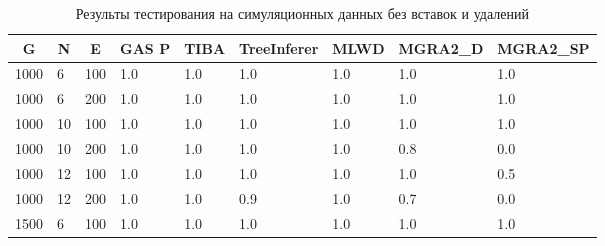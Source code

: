 \begin{table}[H]
\caption{Результы тестирования на симуляционных данных без вставок и удалений}
\label{table:no_indel_results}
\begin{tabular}{|l|l|l|l|l|l|l|l|l|}
\hline
\multicolumn{1}{|c|}{G} & \multicolumn{1}{c|}{N} & \multicolumn{1}{c|}{E} & \multicolumn{1}{c|}{GAS P} & \multicolumn{1}{c|}{TIBA} & \multicolumn{1}{c|}{TreeInferer} & \multicolumn{1}{c|}{MLWD} & \multicolumn{1}{c|}{MGRA2\_D} & \multicolumn{1}{c|}{MGRA2\_SP} \\ \hline
1000                    & 6                      & 100                    & 1.0                        & 1.0                       & 1.0                             & 1.0                       & 1.0                           & 1.0                            \\ \hline
1000                    & 6                      & 200                    & 1.0                        & 1.0                       & 1.0                             & 1.0                       & 1.0                           & 1.0                            \\ \hline
1000                    & 10                     & 100                    & 1.0                        & 1.0                       & 1.0                             & 1.0                       & 1.0                           & 1.0                            \\ \hline
1000                    & 10                     & 200                    & 1.0                        & 1.0                       & 1.0                             & 1.0                       & 0.8                           & 0.0                            \\ \hline
1000                    & 12                     & 100                    & 1.0                        & 1.0                       & 1.0                             & 1.0                       & 1.0                           & 0.5                            \\ \hline
1000                    & 12                     & 200                    & 1.0                        & 1.0                       & 0.9                             & 1.0                       & 0.7                           & 0.0                            \\ \hline
1500                    & 6                      & 100                    & 1.0                        & 1.0                       & 1.0                             & 1.0                       & 1.0                           & 1.0                            \\ \hline

\end{tabular}
\end{table}
